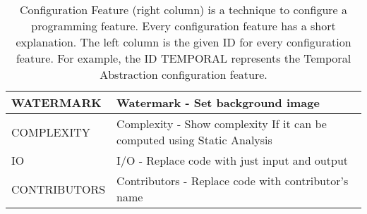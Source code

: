 \begin{table}[H]
\begin{tabular}{|l|p{14cm}|}
WATERMARK    & Watermark - Set background image                                                                                                   \\ \hline
COMPLEXITY   & Complexity - Show complexity If it can be computed using Static Analysis                                                              \\ \hline
IO           & I/O - Replace code with just input and output                                                                                      \\ \hline
CONTRIBUTORS & Contributors - Replace code with contributor's name                                                                                \\ \hline
\end{tabular}
\caption{Configuration Feature (right column) is a technique to configure a programming feature. Every configuration feature has a short explanation. The left column is the given ID for every configuration feature. For example, the ID TEMPORAL represents the Temporal Abstraction configuration feature.}
\label{tab14}
\end{table}
